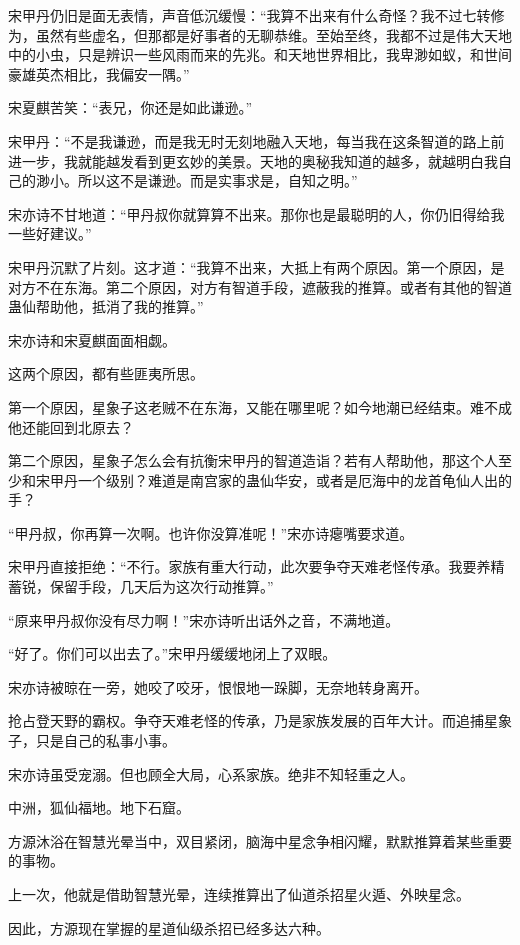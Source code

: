 \begin{this_body}
宋甲丹仍旧是面无表情，声音低沉缓慢：“我算不出来有什么奇怪？我不过七转修为，虽然有些虚名，但那都是好事者的无聊恭维。至始至终，我都不过是伟大天地中的小虫，只是辨识一些风雨而来的先兆。和天地世界相比，我卑渺如蚁，和世间豪雄英杰相比，我偏安一隅。”

宋夏麒苦笑：“表兄，你还是如此谦逊。”

宋甲丹：“不是我谦逊，而是我无时无刻地融入天地，每当我在这条智道的路上前进一步，我就能越发看到更玄妙的美景。天地的奥秘我知道的越多，就越明白我自己的渺小。所以这不是谦逊。而是实事求是，自知之明。”

宋亦诗不甘地道：“甲丹叔你就算算不出来。那你也是最聪明的人，你仍旧得给我一些好建议。”

宋甲丹沉默了片刻。这才道：“我算不出来，大抵上有两个原因。第一个原因，是对方不在东海。第二个原因，对方有智道手段，遮蔽我的推算。或者有其他的智道蛊仙帮助他，抵消了我的推算。”

宋亦诗和宋夏麒面面相觑。

这两个原因，都有些匪夷所思。

第一个原因，星象子这老贼不在东海，又能在哪里呢？如今地潮已经结束。难不成他还能回到北原去？

第二个原因，星象子怎么会有抗衡宋甲丹的智道造诣？若有人帮助他，那这个人至少和宋甲丹一个级别？难道是南宫家的蛊仙华安，或者是厄海中的龙首龟仙人出的手？

“甲丹叔，你再算一次啊。也许你没算准呢！”宋亦诗瘪嘴要求道。

宋甲丹直接拒绝：“不行。家族有重大行动，此次要争夺天难老怪传承。我要养精蓄锐，保留手段，几天后为这次行动推算。”

“原来甲丹叔你没有尽力啊！”宋亦诗听出话外之音，不满地道。

“好了。你们可以出去了。”宋甲丹缓缓地闭上了双眼。

宋亦诗被晾在一旁，她咬了咬牙，恨恨地一跺脚，无奈地转身离开。

抢占登天野的霸权。争夺天难老怪的传承，乃是家族发展的百年大计。而追捕星象子，只是自己的私事小事。

宋亦诗虽受宠溺。但也顾全大局，心系家族。绝非不知轻重之人。

中洲，狐仙福地。地下石窟。

方源沐浴在智慧光晕当中，双目紧闭，脑海中星念争相闪耀，默默推算着某些重要的事物。

上一次，他就是借助智慧光晕，连续推算出了仙道杀招星火遁、外映星念。

因此，方源现在掌握的星道仙级杀招已经多达六种。


\end{this_body}
